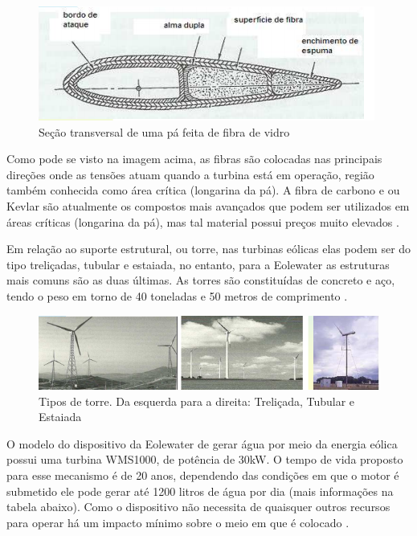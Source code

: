 \begin{figure}[!htbp]
\centering
\includegraphics[scale=0.80]{editaveis/figuras/pa}
\caption[Seção transversal de uma pá feita de fibra de vidro]{Seção transversal de uma pá feita de fibra de vidro\footnotemark}
\FloatBarrier
\label{secao_transversal_pa}
\end{figure}

Como pode se visto na imagem acima, as fibras são colocadas nas principais direções onde as tensões atuam quando a turbina
está em operação, região também conhecida como área crítica (longarina da pá). A fibra de carbono e ou Kevlar são atualmente
os compostos mais avançados que podem ser utilizados em áreas críticas (longarina da pá), mas tal material possui preços muito
elevados \cite{barrosVarela}.  

Em relação ao suporte estrutural, ou torre, nas turbinas eólicas elas podem ser do tipo treliçadas, tubular e estaiada,
no entanto, para a Eolewater as estruturas mais comuns são as duas últimas. As torres são constituídas de concreto e aço,
tendo o peso em torno de 40 toneladas e 50 metros de comprimento \cite{usp}.

\begin{figure}[!htb]
\centering
\includegraphics[scale=0.80]{editaveis/figuras/torre}
\caption[Tipos de torre]{Tipos de torre. Da esquerda para a direita: Treliçada, Tubular e Estaiada \footnotemark}
\FloatBarrier
\label{torre}
\end{figure}

O modelo do dispositivo da Eolewater de gerar água por meio da energia eólica possui uma turbina WMS1000, de potência de 30kW.
O tempo de vida proposto para esse mecanismo é de 20 anos, dependendo das condições em que o motor é submetido ele pode gerar
até 1200 litros de água por dia (mais informações na tabela abaixo). Como o dispositivo não necessita de quaisquer outros 
recursos para operar há um impacto mínimo sobre o meio em que é colocado \cite{renewable}.

